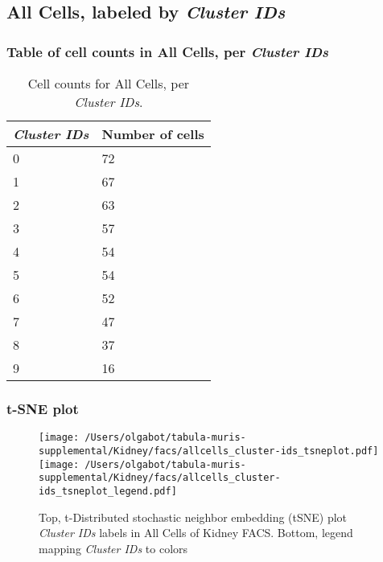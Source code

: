 \clearpage

\subsection{All Cells, labeled by \emph{Cluster IDs}}
\subsubsection{Table of cell counts in All Cells, per \emph{Cluster IDs}}\begin{table}[h]
\centering
\label{my-label}
\begin{tabular}{@{}ll@{}}
\toprule

\emph{Cluster IDs}& Number of cells \\ \midrule
0 & 72 \\

1 & 67 \\

2 & 63 \\

3 & 57 \\

4 & 54 \\

5 & 54 \\

6 & 52 \\

7 & 47 \\

8 & 37 \\

9 & 16 \\
\bottomrule
\end{tabular}
\caption{Cell counts for All Cells, per \emph{Cluster IDs}.}
\end{table}

\clearpage
\subsubsection{t-SNE plot}
\begin{figure}[h]
\centering
\texttt{[image: /Users/olgabot/tabula-muris-supplemental/Kidney/facs/allcells\_cluster-ids\_tsneplot.pdf]}
\texttt{[image: /Users/olgabot/tabula-muris-supplemental/Kidney/facs/allcells\_cluster-ids\_tsneplot\_legend.pdf]}
\caption{Top, t-Distributed stochastic neighbor embedding (tSNE) plot  \emph{Cluster IDs} labels in All Cells of Kidney FACS. Bottom, legend mapping \emph{Cluster IDs} to colors}
\end{figure}


